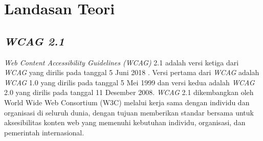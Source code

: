 \setcounter{secnumdepth}{3}

\chapter{Landasan Teori}
\label{chap:teori}

\section{\textit{WCAG 2.1}}
\label{sec:wcag_2.1} 
\textit{Web Content Accessibility Guidelines (WCAG)} 2.1 adalah versi ketiga dari \textit{WCAG} yang dirilis pada tanggal 5 Juni 2018 \cite{WCAG:2.1}. Versi pertama dari \textit{WCAG} adalah \textit{WCAG} 1.0 yang dirilis pada tanggal 5 Mei 1999 dan versi kedua adalah \textit{WCAG} 2.0 yang dirilis pada tanggal 11 Desember 2008. \textit{WCAG} 2.1 dikembangkan oleh World Wide Web Consortium (W3C) melalui kerja sama dengan individu dan organisasi di seluruh dunia, dengan tujuan memberikan standar bersama untuk aksesibilitas konten web yang memenuhi kebutuhan individu, organisasi, dan pemerintah internasional. 

